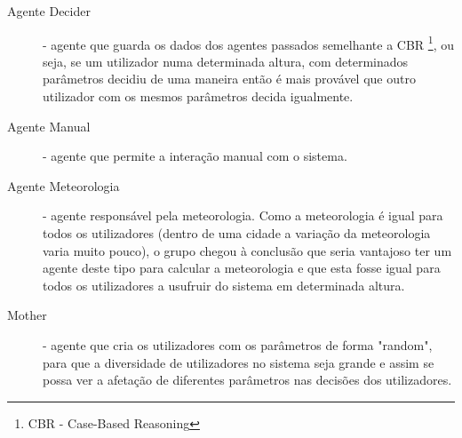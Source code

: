 \begin{description}
\newpage
\item [Agente Decider] - agente que guarda os dados dos agentes passados semelhante a CBR \footnote{CBR - Case-Based Reasoning}, ou seja, se um utilizador numa determinada altura, com determinados parâmetros decidiu de uma maneira então é mais provável que outro utilizador com os mesmos parâmetros decida igualmente.
\\
\item [Agente Manual] - agente que permite a interação manual com o sistema.
\\
\item [Agente Meteorologia] - agente responsável pela meteorologia. Como a meteorologia é igual para todos os utilizadores (dentro de uma cidade a variação da meteorologia varia muito pouco), o grupo chegou à conclusão que seria vantajoso ter um agente deste tipo para calcular a meteorologia e que esta fosse igual para todos os utilizadores a usufruir do sistema em determinada altura.
\\
\item [Mother] - agente que cria os utilizadores com os parâmetros de forma "random", para que a diversidade de utilizadores no sistema seja grande e assim se possa ver a afetação de diferentes parâmetros nas decisões dos utilizadores.
\end{description}
